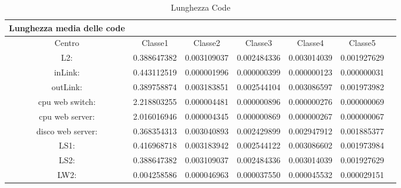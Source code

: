 \begin{table}[htbp]
\begin{center}
\begin{tabular}{||c|c|c|c|c|c|c||}
\hline
Lunghezza media delle code\\
\hline
Centro &Classe1 &Classe2 &Classe3 &Classe4 &Classe5\\
\hline
\hline
L2: &0.388647382 &0.003109037 &0.002484336 &0.003014039 &0.001927629\\
\hline
inLink: &0.443112519 &0.000001996 &0.000000399 &0.000000123 &0.000000031\\
\hline
outLink: &0.389758874 &0.003183851 &0.002544104 &0.003086597 &0.001973982\\
\hline
cpu web switch: &2.218803255 &0.000004481 &0.000000896 &0.000000276 &0.000000069\\
\hline
cpu web server: &2.016016946 &0.000004345 &0.000000869 &0.000000267 &0.000000067\\
\hline
disco web server: &0.368354313 &0.003040893 &0.002429899 &0.002947912 &0.001885377\\
\hline
LS1: &0.416968718 &0.003183942 &0.002544122 &0.003086602 &0.001973984\\
\hline
LS2: &0.388647382 &0.003109037 &0.002484336 &0.003014039 &0.001927629\\
\hline
LW2: &0.004258586 &0.000046963 &0.000037550 &0.000045532 &0.000029151\\
\hline
\end{tabular}
\end{center}
\caption{Lunghezza Code}
\label{lunghezzacode}
\end{table}

